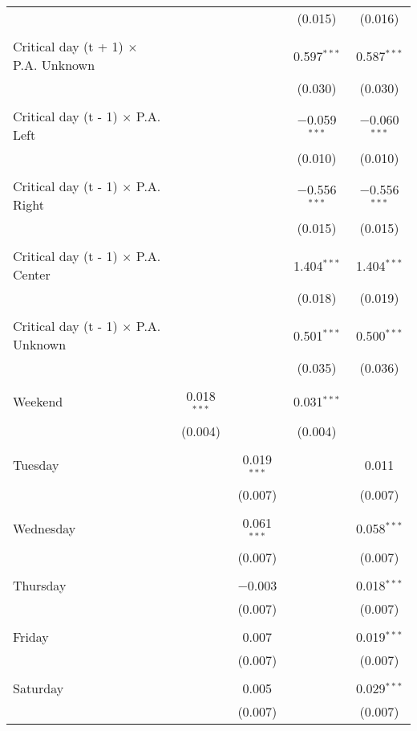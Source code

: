 \documentclass[
]{article}
\begin{document}
\begin{table}[!htbp]
{\begin{tabular}{@{\extracolsep{5pt}}lcccc}
  &  &  & (0.015) & (0.016) \\ 
  & & & & \\ 
 Critical day (t + 1) $\times$ P.A. Unknown &  &  & 0.597$^{***}$ & 0.587$^{***}$ \\ 
  &  &  & (0.030) & (0.030) \\ 
  & & & & \\ 
 Critical day (t - 1) $\times$ P.A. Left &  &  & $-$0.059$^{***}$ & $-$0.060$^{***}$ \\ 
  &  &  & (0.010) & (0.010) \\ 
  & & & & \\ 
 Critical day (t - 1) $\times$ P.A. Right &  &  & $-$0.556$^{***}$ & $-$0.556$^{***}$ \\ 
  &  &  & (0.015) & (0.015) \\ 
  & & & & \\ 
 Critical day (t - 1) $\times$ P.A. Center &  &  & 1.404$^{***}$ & 1.404$^{***}$ \\ 
  &  &  & (0.018) & (0.019) \\ 
  & & & & \\ 
 Critical day (t - 1) $\times$ P.A. Unknown &  &  & 0.501$^{***}$ & 0.500$^{***}$ \\ 
  &  &  & (0.035) & (0.036) \\ 
  & & & & \\ 
 Weekend & 0.018$^{***}$ &  & 0.031$^{***}$ &  \\ 
  & (0.004) &  & (0.004) &  \\ 
  & & & & \\ 
 Tuesday &  & 0.019$^{***}$ &  & 0.011 \\ 
  &  & (0.007) &  & (0.007) \\ 
  & & & & \\ 
 Wednesday &  & 0.061$^{***}$ &  & 0.058$^{***}$ \\ 
  &  & (0.007) &  & (0.007) \\ 
  & & & & \\ 
 Thursday &  & $-$0.003 &  & 0.018$^{***}$ \\ 
  &  & (0.007) &  & (0.007) \\ 
  & & & & \\ 
 Friday &  & 0.007 &  & 0.019$^{***}$ \\ 
  &  & (0.007) &  & (0.007) \\ 
  & & & & \\ 
 Saturday &  & 0.005 &  & 0.029$^{***}$ \\ 
  &  & (0.007) &  & (0.007) \\ 

\end{tabular}}
\end{table}
\end{document}
